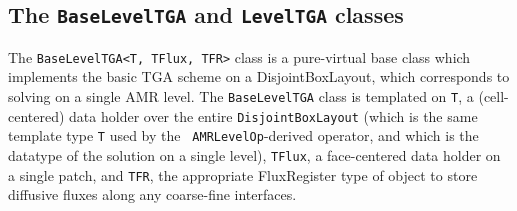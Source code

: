 \subsection{The {\tt BaseLevelTGA} and {\tt LevelTGA} classes}
The {\tt BaseLevelTGA<T, TFlux, TFR>} class is a pure-virtual base
class which implements the basic TGA scheme on a
DisjointBoxLayout, which corresponds to solving on a single AMR
level. The {\tt BaseLevelTGA} class is templated on {\tt T}, a
(cell-centered) data holder over the entire {\tt DisjointBoxLayout}
(which is the same template type {\tt T} used by the {\tt
  AMRLevelOp}-derived operator, and which is the datatype of the
solution on a single level), {\tt TFlux}, a face-centered data
holder on a single patch, and {\tt TFR}, the appropriate FluxRegister
type of object to store diffusive fluxes along any coarse-fine
interfaces. 

